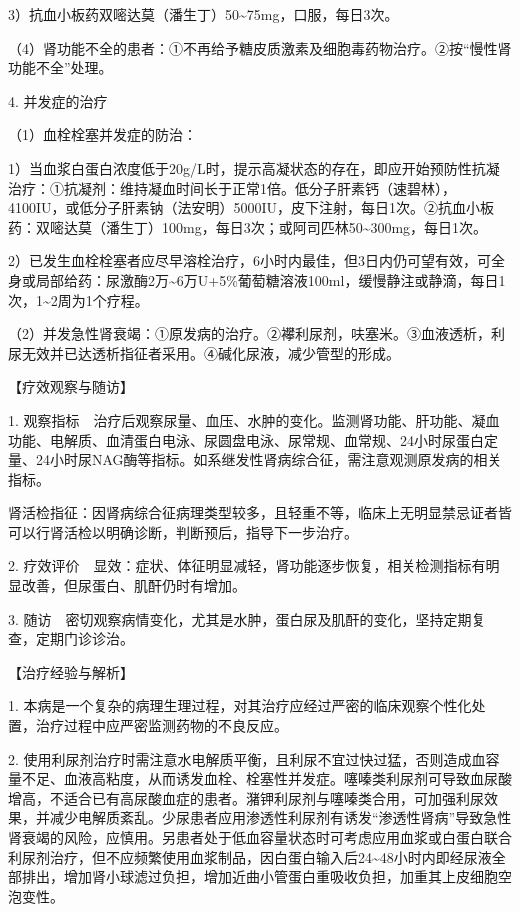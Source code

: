3）抗血小板药双嘧达莫（潘生丁）50\textasciitilde{}75mg，口服，每日3次。

（4）肾功能不全的患者：①不再给予糖皮质激素及细胞毒药物治疗。②按“慢性肾功能不全”处理。

4. 并发症的治疗

（1）血栓栓塞并发症的防治：

1）当血浆白蛋白浓度低于20g/L时，提示高凝状态的存在，即应开始预防性抗凝治疗：①抗凝剂：维持凝血时间长于正常1倍。低分子肝素钙（速碧林），4100IU，或低分子肝素钠（法安明）5000IU，皮下注射，每日1次。②抗血小板药：双嘧达莫（潘生丁）100mg，每日3次；或阿司匹林50\textasciitilde{}300mg，每日1次。

2）已发生血栓栓塞者应尽早溶栓治疗，6小时内最佳，但3日内仍可望有效，可全身或局部给药：尿激酶2万\textasciitilde{}6万U+5\%葡萄糖溶液100ml，缓慢静注或静滴，每日1次，1\textasciitilde{}2周为1个疗程。

（2）并发急性肾衰竭：①原发病的治疗。②襻利尿剂，呋塞米。③血液透析，利尿无效并已达透析指征者采用。④碱化尿液，减少管型的形成。

【疗效观察与随访】

1.
观察指标　治疗后观察尿量、血压、水肿的变化。监测肾功能、肝功能、凝血功能、电解质、血清蛋白电泳、尿圆盘电泳、尿常规、血常规、24小时尿蛋白定量、24小时尿NAG酶等指标。如系继发性肾病综合征，需注意观测原发病的相关指标。

肾活检指征：因肾病综合征病理类型较多，且轻重不等，临床上无明显禁忌证者皆可以行肾活检以明确诊断，判断预后，指导下一步治疗。

2.
疗效评价　显效：症状、体征明显减轻，肾功能逐步恢复，相关检测指标有明显改善，但尿蛋白、肌酐仍时有增加。

3.
随访　密切观察病情变化，尤其是水肿，蛋白尿及肌酐的变化，坚持定期复查，定期门诊诊治。

【治疗经验与解析】

1.
本病是一个复杂的病理生理过程，对其治疗应经过严密的临床观察个性化处置，治疗过程中应严密监测药物的不良反应。

2.
使用利尿剂治疗时需注意水电解质平衡，且利尿不宜过快过猛，否则造成血容量不足、血液高粘度，从而诱发血栓、栓塞性并发症。噻嗪类利尿剂可导致血尿酸增高，不适合已有高尿酸血症的患者。潴钾利尿剂与噻嗪类合用，可加强利尿效果，并减少电解质紊乱。少尿患者应用渗透性利尿剂有诱发“渗透性肾病”导致急性肾衰竭的风险，应慎用。另患者处于低血容量状态时可考虑应用血浆或白蛋白联合利尿剂治疗，但不应频繁使用血浆制品，因白蛋白输入后24\textasciitilde{}48小时内即经尿液全部排出，增加肾小球滤过负担，增加近曲小管蛋白重吸收负担，加重其上皮细胞空泡变性。

